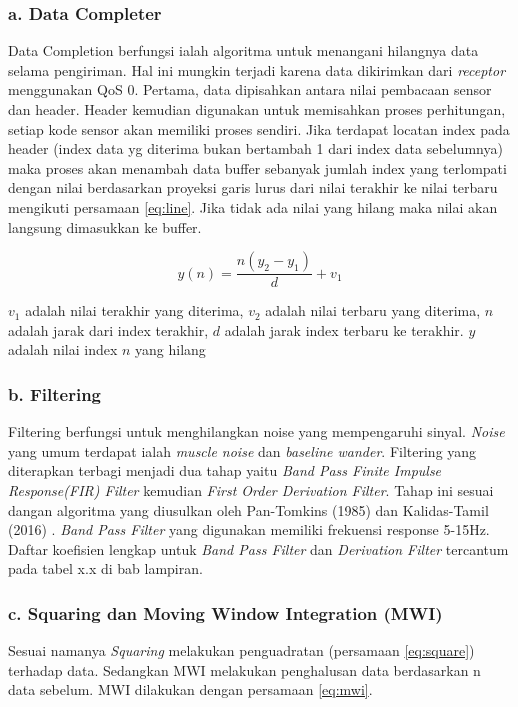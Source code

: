 \subsubsection{a. Data Completer}
Data Completion berfungsi ialah algoritma untuk menangani hilangnya data selama pengiriman. Hal ini mungkin terjadi karena data dikirimkan dari \textit{receptor} menggunakan QoS 0. Pertama, data dipisahkan antara nilai pembacaan sensor dan header. Header kemudian digunakan untuk memisahkan proses perhitungan, setiap kode sensor akan memiliki proses sendiri. Jika terdapat locatan index pada header (index data yg diterima bukan bertambah 1 dari index data sebelumnya) maka proses akan menambah data buffer sebanyak jumlah index yang terlompati dengan nilai berdasarkan proyeksi garis lurus dari nilai terakhir ke nilai terbaru mengikuti persamaan \ref{eq:line}. Jika tidak ada nilai yang hilang maka nilai akan langsung dimasukkan ke buffer.

\begin{equation}
y(n) = \dfrac{n (y_{2} - y_{1})}{d} + v_{1}
\label{eq:line}
\end{equation}

$v_{1}$ adalah nilai terakhir yang diterima, $v_{2}$ adalah nilai terbaru yang diterima, $n$ adalah jarak dari index terakhir, $d$ adalah jarak index terbaru ke terakhir. $y$ adalah nilai index $n$ yang hilang

\subsubsection{b. Filtering}
Filtering berfungsi untuk menghilangkan noise yang mempengaruhi sinyal. \textit{Noise} yang umum terdapat ialah \textit{muscle noise} dan \textit{baseline wander}. Filtering yang diterapkan terbagi menjadi dua tahap yaitu \textit{Band Pass Finite Impulse Response(FIR) Filter} kemudian \textit{First Order Derivation Filter}. Tahap ini sesuai dangan algoritma yang diusulkan oleh Pan-Tomkins (1985)\cite{pantom} dan Kalidas-Tamil (2016) \cite{ecg_syncro}. \textit{Band Pass Filter} yang digunakan memiliki frekuensi response 5-15Hz. Daftar koefisien lengkap untuk \textit{Band Pass Filter} dan \textit{Derivation Filter} tercantum pada tabel x.x di bab lampiran.

\subsubsection{c. Squaring dan Moving Window Integration (MWI)}
Sesuai namanya \textit{Squaring} melakukan penguadratan (persamaan \ref{eq:square}) terhadap data. Sedangkan MWI melakukan penghalusan data berdasarkan n data sebelum. MWI dilakukan dengan persamaan \ref{eq:mwi}.

